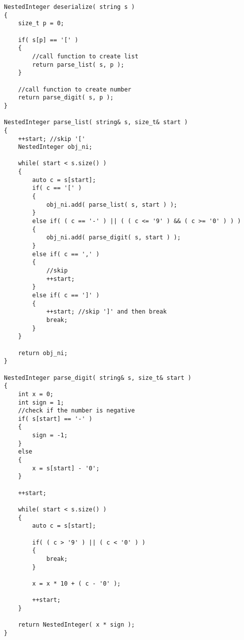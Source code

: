 \begin{lstlisting}[style=customc, caption={Recursion}]
NestedInteger deserialize( string s )
{
    size_t p = 0;

    if( s[p] == '[' )
    {
        //call function to create list
        return parse_list( s, p );
    }

    //call function to create number
    return parse_digit( s, p );
}

NestedInteger parse_list( string& s, size_t& start )
{
    ++start; //skip '['
    NestedInteger obj_ni;

    while( start < s.size() )
    {
        auto c = s[start];
        if( c == '[' )
        {
            obj_ni.add( parse_list( s, start ) );
        }
        else if( ( c == '-' ) || ( ( c <= '9' ) && ( c >= '0' ) ) )
        {
            obj_ni.add( parse_digit( s, start ) );
        }
        else if( c == ',' )
        {
            //skip
            ++start;
        }
        else if( c == ']' )
        {
            ++start; //skip ']' and then break
            break;
        }
    }

    return obj_ni;
}

NestedInteger parse_digit( string& s, size_t& start )
{
    int x = 0;
    int sign = 1;
    //check if the number is negative
    if( s[start] == '-' )
    {
        sign = -1;
    }
    else
    {
        x = s[start] - '0';
    }

    ++start;

    while( start < s.size() )
    {
        auto c = s[start];

        if( ( c > '9' ) || ( c < '0' ) )
        {
            break;
        }

        x = x * 10 + ( c - '0' );

        ++start;
    }

    return NestedInteger( x * sign );
}
\end{lstlisting}

